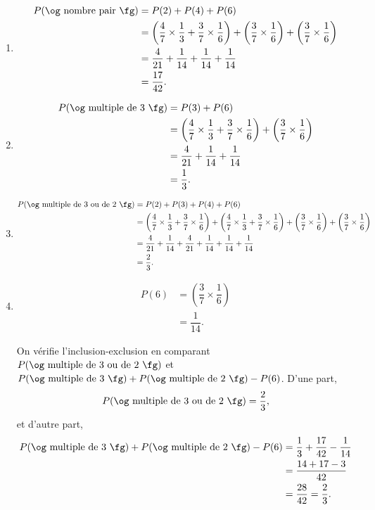 \begin{sol}
	\begin{enumerate}
		\item
			\begin{align*}
				P(\text{\og nombre pair \fg}) &= P(2) + P(4) + P(6) \\
					&= \left( \dfrac47 \times \dfrac13 + \dfrac37\times\dfrac16 \right) + \left( \dfrac37 \times \dfrac16 \right) + \left( \dfrac37 \times \dfrac16 \right) \\
					&= \dfrac4{21} + \dfrac1{14} + \dfrac1{14} + \dfrac1{14} \\
					&= \dfrac{17}{42}.
			\end{align*}
		\item
			\begin{align*}
				P(\text{\og multiple de $3$ \fg}) &= P(3) + P(6) \\
					&= \left( \dfrac47 \times \dfrac13 + \dfrac37\times\dfrac16 \right) + \left( \dfrac37 \times \dfrac16 \right) \\
					&= \dfrac4{21} + \dfrac1{14} + \dfrac1{14} \\
					&= \dfrac13.
			\end{align*}
		\item
			\begin{align*}
				P(\text{\og multiple de $3$ ou de $2$ \fg}) &= P(2) + P(3) + P(4) + P(6) \\
					&= \left( \dfrac47 \times \dfrac13 + \dfrac37\times\dfrac16 \right) + \left( \dfrac47 \times \dfrac13 + \dfrac37\times\dfrac16 \right) + \left( \dfrac37 \times \dfrac16 \right) + \left( \dfrac37 \times \dfrac16 \right) \\
					&= \dfrac4{21} + \dfrac1{14} + \dfrac4{21} + \dfrac1{14} + \dfrac1{14} + \dfrac1{14} \\
					&= \dfrac23.
			\end{align*}
		\item 
			\begin{align*}
				P(6) &=\left( \dfrac37 \times \dfrac16 \right) \\
					&= \dfrac1{14}.
			\end{align*}
			
		On vérifie l'inclusion-exclusion en comparant $P(\text{\og multiple de $3$ ou de $2$ \fg})$ et $P(\text{\og multiple de $3$ \fg}) + P(\text{\og multiple de $2$ \fg}) - P(6)$.
		D'une part,
			\[ P(\text{\og multiple de $3$ ou de $2$ \fg}) = \dfrac23, \]
		et d'autre part,
			\begin{align*}
				P(\text{\og multiple de $3$ \fg}) + P(\text{\og multiple de $2$ \fg}) - P(6) &= \dfrac13 + \dfrac{17}{42} - \dfrac1{14} \\
				&= \dfrac{14 + 17 - 3}{42} \\
				&= \dfrac{28}{42} = \dfrac23.
			\end{align*}
	\end{enumerate}
\end{sol}
\fi

